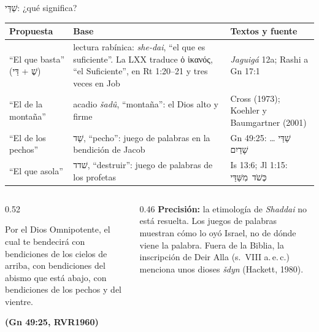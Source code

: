 \documentclass[hyperref={bookmarks=false},aspectratio=169]{beamer}
\newcommand{\heb}[1]{\mbox{\foreignlanguage{hebrew}{#1}}}
\newcommand{\grc}[1]{\foreignlanguage{ancientgreek}{#1}}
\newcommand{\fuente}[1]{\par\hfill{\upshape\bfseries\footnotesize\textcolor{azul}{#1}}}
\newcommand{\precision}[1]{{\footnotesize\color{gris}\textbf{Precisión:} #1}}
\begin{document}
\begin{frame}{\heb{שַׁדַּי}: ¿qué significa?}
\scriptsize\renewcommand{\arraystretch}{1.18}
\begin{tabular}{@{}>{\RaggedRight\arraybackslash}p{2.6cm}>{\RaggedRight\arraybackslash}p{5.3cm}>{\RaggedRight\arraybackslash}p{4.0cm}@{}}
\toprule
\textbf{Propuesta} & \textbf{Base} & \textbf{Textos y fuente} \\ \midrule
``El que basta'' (\heb{שֶׁ} + \heb{דַּי}) & lectura rabínica: \emph{she-dai}, ``el que es suficiente''. La LXX traduce \grc{ὁ ἱκανός}, ``el Suficiente'', en Rt 1:20--21 y tres veces en Job & \emph{Jaguigá} 12a; Rashi a Gn 17:1 \\
``El de la montaña'' & acadio \emph{šadû}, ``montaña'': el Dios alto y firme & Cross (1973); Koehler y Baumgartner (2001) \\
``El de los pechos'' & \heb{שַׁד}, ``pecho'': juego de palabras en la bendición de Jacob & Gn 49:25: \heb{שַׁדַּי} \ldots{} \heb{שָׁדַיִם} \\
``El que asola'' & \heb{שׁדד}, ``destruir'': juego de palabras de los profetas & Is 13:6; Jl 1:15: \heb{כְּשֹׁד מִשַּׁדַּי} \\
\bottomrule
\end{tabular}\par\smallskip
\begin{columns}[t,onlytextwidth]
\begin{column}{0.52\textwidth}
\begin{cita}[fontupper=\scriptsize\itshape]Por el Dios Omnipotente, el cual te bendecirá con bendiciones de los cielos de arriba, con bendiciones del abismo que está abajo, con bendiciones de los pechos y del vientre.\fuente{(Gn 49:25, RVR1960)}\end{cita}
\end{column}
\begin{column}{0.46\textwidth}\scriptsize
\precision{la etimología de \emph{Shaddai} no está resuelta. Los juegos de palabras muestran cómo lo oyó Israel, no de dónde viene la palabra. Fuera de la Biblia, la inscripción de Deir Alla (s.~VIII a.\,e.\,c.) menciona unos dioses \emph{šdyn} (Hackett, 1980).}
\end{column}
\end{columns}
\end{frame}
\end{document}
